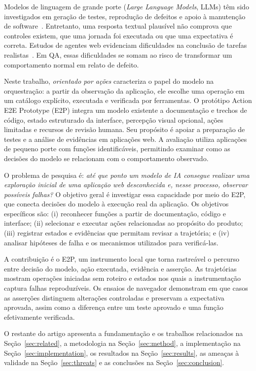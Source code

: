 \documentclass[12pt]{article}
\begin{document}
Modelos de linguagem de grande porte (\textit{Large Language Models}, LLMs) têm sido investigados em geração de testes, reprodução de defeitos e apoio à manutenção de software~\cite{wang2024survey,kang2023libro}. Entretanto, uma resposta textual plausível não comprova que controles existem, que uma jornada foi executada ou que uma expectativa é correta. Estudos de agentes web evidenciam dificuldades na conclusão de tarefas realistas~\cite{zhou2024webarena,drouin2024workarena}. Em QA, essas dificuldades se somam ao risco de transformar um comportamento normal em relato de defeito.

Neste trabalho, \textit{orientado por ações} caracteriza o papel do modelo na orquestração: a partir da observação da aplicação, ele escolhe uma operação em um catálogo explícito, executada e verificada por ferramentas. O protótipo Action E2E Prototype (E2P) integra um modelo existente a documentação e trechos de código, estado estruturado da interface, percepção visual opcional, ações limitadas e recursos de revisão humana. Seu propósito é apoiar a preparação de testes e a análise de evidências em aplicações web. A avaliação utiliza aplicações de pequeno porte com funções identificáveis, permitindo examinar como as decisões do modelo se relacionam com o comportamento observado.

O problema de pesquisa é: \textit{até que ponto um modelo de IA consegue realizar uma exploração inicial de uma aplicação web desconhecida e, nesse processo, observar possíveis falhas?} O objetivo geral é investigar essa capacidade por meio do E2P, que conecta decisões do modelo à execução real da aplicação. Os objetivos específicos são: (i) reconhecer funções a partir de documentação, código e interface; (ii) selecionar e executar ações relacionadas ao propósito do produto; (iii) registrar estados e evidências que permitam revisar a trajetória; e (iv) analisar hipóteses de falha e os mecanismos utilizados para verificá-las.

A contribuição é o E2P, um instrumento local que torna rastreável o percurso entre decisão do modelo, ação executada, evidência e asserção. As trajetórias mostram operações iniciadas sem roteiro e estados nos quais a instrumentação captura falhas reproduzíveis. Os ensaios de navegador demonstram em que casos as asserções distinguem alterações controladas e preservam a expectativa aprovada, assim como a diferença entre um teste aprovado e uma função efetivamente verificada.

O restante do artigo apresenta a fundamentação e os trabalhos relacionados na Seção~\ref{sec:related}, a metodologia na Seção~\ref{sec:method}, a implementação na Seção~\ref{sec:implementation}, os resultados na Seção~\ref{sec:results}, as ameaças à validade na Seção~\ref{sec:threats} e as conclusões na Seção~\ref{sec:conclusion}.
\end{document}
